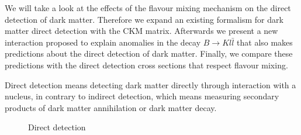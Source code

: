 We will take a look at the effects of the flavour mixing mechanism on the direct detection of dark matter. Therefore we expand an existing formalism for dark matter direct detection with the CKM matrix. Afterwards we present a new interaction proposed to explain anomalies in the decay $B\rightarrow Kl\bar{l}$ that also makes predictions about the direct detection of dark matter. Finally, we compare these predictions with the direct detection cross sections that respect flavour mixing.

Direct detection means detecting dark matter directly through interaction with a nucleus, in contrary to indirect detection, which means measuring secondary products of dark matter annihilation or dark matter decay.



\begin{figure}
	\centering
	
	\caption{Direct detection}
	\label{fig:DirectDetection}
\end{figure}
